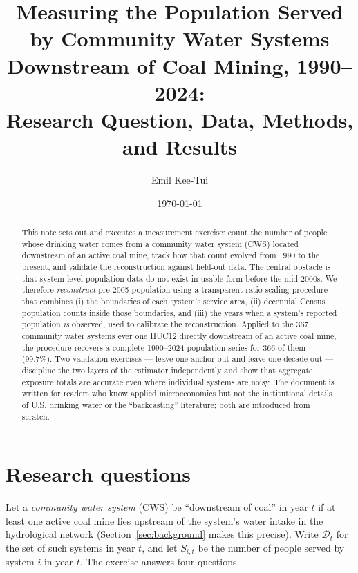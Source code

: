 \documentclass[11pt]{article}
\title{Measuring the Population Served by Community Water Systems\\
Downstream of Coal Mining, 1990--2024:\\
\large Research Question, Data, Methods, and Results}
\author{Emil Kee-Tui}
\date{\today}
\begin{document}
\maketitle

\begin{abstract}
\noindent
This note sets out and executes a measurement exercise: count the number of
people whose drinking water comes from a community water system (CWS) located
downstream of an active coal mine, track how that count evolved from 1990 to
the present, and validate the reconstruction against held-out data. The
central obstacle is that system-level population data do not exist in usable
form before the mid-2000s. We therefore \emph{reconstruct} pre-2005 population
using a transparent ratio-scaling procedure that combines (i) the boundaries
of each system's service area, (ii) decennial Census population counts inside
those boundaries, and (iii) the years when a system's reported population
\emph{is} observed, used to calibrate the reconstruction. Applied to the 367
community water systems ever one HUC12 directly downstream of an active coal
mine, the procedure recovers a complete 1990--2024 population series for 366
of them (99.7\%). Two validation exercises --- leave-one-anchor-out and
leave-one-decade-out --- discipline the two layers of the estimator
independently and show that aggregate exposure totals are accurate even where
individual systems are noisy. The document is written for readers who know
applied microeconomics but not the institutional details of U.S. drinking
water or the ``backcasting'' literature; both are introduced from scratch.
\end{abstract}

\tableofcontents

\section{Research questions}
\label{sec:questions}

Let a \emph{community water system} (CWS) be ``downstream of coal'' in year
$t$ if at least one active coal mine lies upstream of the system's water
intake in the hydrological network (Section~\ref{sec:background} makes this
precise). Write $\mathcal{D}_t$ for the set of such systems in year $t$, and
let $S_{i,t}$ be the number of people served by system $i$ in year $t$. The
exercise answers four questions.
\end{document}
